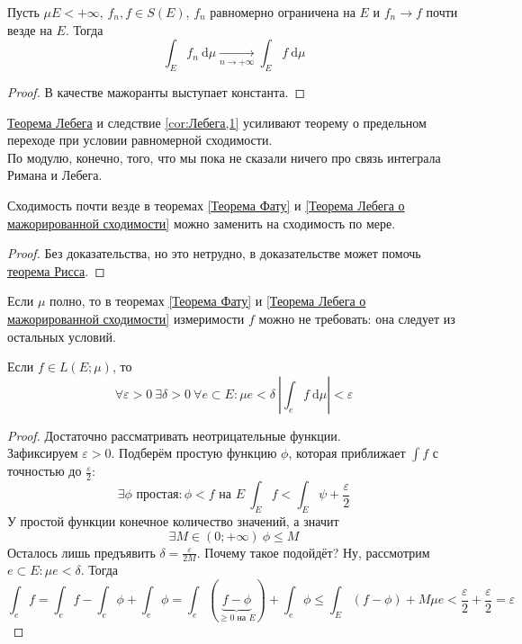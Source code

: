 \documentclass{article}
\let\eps\varepsilon
\begin{document}
    \begin{corollary}
        \label{cor:Лебега,1}
        Пусть $\mu E<+\infty$, $f_n,f\in S(E)$, $f_n$ равномерно ограничена на $E$ и $f_n\rightarrow f$ почти везде на $E$. Тогда
        $$
        \int_Ef_n~\mathrm d\mu\underset{n\to+\infty}\longrightarrow\int_Ef~\mathrm d\mu
        $$
    \end{corollary}
    \begin{proof}
        В качестве мажоранты выступает константа.
    \end{proof}
    \begin{remark}
        \hyperref[Теорема Лебега о мажорированной сходимости]{Теорема Лебега} и следствие \ref{cor:Лебега,1} усиливают теорему о предельном переходе при условии равномерной сходимости.\\
        По модулю, конечно, того, что мы пока не сказали ничего про связь интеграла Римана и Лебега.
    \end{remark}
    \begin{claim}
        Сходимость почти везде в теоремах \ref{Теорема Фату} и \ref{Теорема Лебега о мажорированной сходимости} можно заменить на сходимость по мере.
    \end{claim}
    \begin{proof}
        Без доказательства, но это нетрудно, в доказательстве может помочь \hyperref[Теорема Рисса]{теорема Рисса}.
    \end{proof}
    \begin{claim}
        Если $\mu$ полно, то в теоремах \ref{Теорема Фату} и \ref{Теорема Лебега о мажорированной сходимости} измеримости $f$ можно не требовать: она следует из остальных условий.
    \end{claim}
    \begin{theorem}
        \label{Абсолютная непрерывность интеграла}
        Если $f\in L(E;\mu)$, то
        $$
        \forall\eps>0~\exists\delta>0~\forall e\subset E:\mu e<\delta~\left|\int_ef~\mathrm d\mu\right|<\eps
        $$
    \end{theorem}
    \begin{proof}
        Достаточно рассматривать неотрицательные функции.\\
        Зафиксируем $\eps>0$. Подберём простую функцию $\phi$, которая приближает $\int f$ с точностью до $\frac\eps2$:
        $$
        \exists\phi\text{ простая}:\phi<f\text{ на }E~\int_Ef<\int_E\psi+\frac\eps2
        $$
        У простой функции конечное количество значений, а значит
        $$
        \exists M\in(0;+\infty)~\phi\leqslant M
        $$
        Осталось лишь предъявить $\delta=\frac\eps{2M}$. Почему такое подойдёт? Ну, рассмотрим $e\subset E:\mu e<\delta$. Тогда
        $$
        \int_ef=\int_ef-\int_e\phi+\int_e\phi=\int_e(\underbrace{f-\phi}_{\geqslant0\text{ на }E})+\int_e\phi\leqslant\int_E(f-\phi)+M\mu e<\frac\eps2+\frac\eps2=\eps
        $$
    \end{proof}
\end{document}
